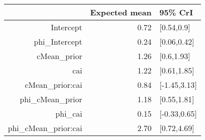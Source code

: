 \begin{tabular}{rrl}
  \hline
 & Expected mean & 95\% CrI \\ 
  \hline
Intercept & 0.72 & [0.54,0.9] \\ 
  phi\_Intercept & 0.24 & [0.06,0.42] \\ 
  cMean\_prior & 1.26 & [0.6,1.93] \\ 
  cai & 1.22 & [0.61,1.85] \\ 
  cMean\_prior:cai & 0.84 & [-1.45,3.13] \\ 
  phi\_cMean\_prior & 1.18 & [0.55,1.81] \\ 
  phi\_cai & 0.15 & [-0.33,0.65] \\ 
  phi\_cMean\_prior:cai & 2.70 & [0.72,4.69] \\ 
   \hline
\end{tabular}

